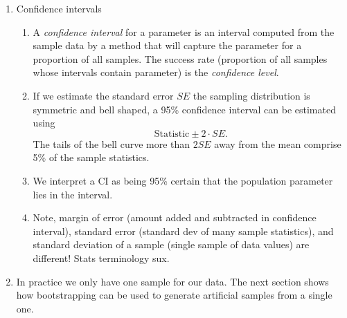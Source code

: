 \documentclass{article}
\begin{document}
\begin{enumerate}
\item Confidence intervals
\begin{enumerate}
\item A \emph{confidence interval} for a parameter is an interval computed from the sample data by a method that will capture the parameter for a proportion of all samples. The success rate (proportion of all samples whose intervals contain parameter) is the \emph{confidence level}.
\item If we estimate the standard error $SE$ the sampling distribution is symmetric and bell shaped, a 95\% confidence interval can be estimated using 
\[
\text{Statistic} \pm 2 \cdot SE.
\]
The tails of the bell curve more than $2SE$ away from the mean comprise 5\% of the sample statistics.
\item We interpret a CI as being 95\% certain that the population parameter lies in the interval.
\item Note, margin of error (amount added and subtracted in confidence interval), standard error (standard dev of many sample statistics), and standard deviation of a sample (single sample of data values) are different! Stats terminology sux.
\end{enumerate}

\item In practice we only have one sample for our data. The next section shows how bootstrapping can be used to generate artificial samples from a single one.

\end{enumerate}

\end{document}
